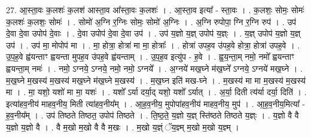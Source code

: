 \documentclass[17pt]{extarticle}
\begin{document}
27. आ॒स्ता॒वः क॒लशः॑ क॒लश॑ आस्ता॒व आ᳚स्ता॒वः क॒लशः॑ । . आ॒स्ता॒व इत्या᳚ - स्ता॒वः । . क॒लशः॒ सोमः॒ सोमः॑ क॒लशः॑ क॒लशः॒ सोमः॑ । . सोमो॑ अ॒ग्नि र॒ग्निः सोमः॒ सोमो॑ अ॒ग्निः । . अ॒ग्नि रुपोपा॒ ग्नि र॒ग्नि रुप॑ । . उप॑ दे॒वा दे॒वा उपोप॑ दे॒वाः । . दे॒वा उपोप॑ दे॒वा दे॒वा उप॑ । . उप॑ य॒ज्ञो य॒ज्ञ् उपोप॑ य॒ज्ञ्ः । . य॒ज्ञ् उपोप॑ य॒ज्ञो य॒ज्ञ् उप॑ । . उप॑ मा॒ मोपोप॑ मा । . मा॒ होत्रा॒ होत्रा॑ मा मा॒ होत्राः᳚ । . होत्रा॑ उपह॒व उ॑पह॒वे होत्रा॒ होत्रा॑ उपह॒वे । . उ॒प॒ह॒वे ह्व॑यन्ताꣳ ह्वयन्ता मुपह॒व उ॑पह॒वे ह्व॑यन्ताम् । . उ॒प॒ह॒व इत्यु॑प - ह॒वे । . ह्व॒य॒न्ता॒म् नमो॒ नमो᳚ ह्वयन्ताꣳ ह्वयन्ता॒म् नमः॑ । . नमो॒ ऽग्नये॒ ऽग्नये॒ नमो॒ नमो॒ ऽग्नये᳚ । . अ॒ग्नये॑ मख॒घ्ने म॑ख॒घ्ने᳚ ऽग्नये॒ ऽग्नये॑ मख॒घ्ने । . म॒ख॒घ्ने म॒खस्य॑ म॒खस्य॑ मख॒घ्ने म॑ख॒घ्ने म॒खस्य॑ । . म॒ख॒घ्न इति॑ मख-घ्ने । . म॒खस्य॑ मा मा म॒खस्य॑ म॒खस्य॑ मा । . मा॒ यशो॒ यशो॑ मा मा॒ यशः॑ । . यशो᳚ ऽर्या दर्या॒द् यशो॒ यशो᳚ ऽर्यात् । . अ॒र्या॒ दिती त्य॑र्या दर्या॒ दिति॑ । . इत्या॑हव॒नीय॑ माहव॒नीय॒ मिती त्या॑हव॒नीय᳚म् । . आ॒ह॒व॒नीय॒ मुपोपा॑हव॒नीय॑ माहव॒नीय॒ मुप॑ । . आ॒ह॒व॒नीय॒मित्या᳚ - ह॒व॒नीय᳚म् । . उप॑ तिष्ठते तिष्ठत॒ उपोप॑ तिष्ठते । . ति॒ष्ठ॒ते॒ य॒ज्ञो य॒ज्ञ् स्ति॑ष्ठते तिष्ठते य॒ज्ञ्ः । . य॒ज्ञो वै वै य॒ज्ञो य॒ज्ञो वै । . वै म॒खो म॒खो वै वै म॒खः । . म॒खो य॒ज्ञ्ं ॅय॒ज्ञ्म् म॒खो म॒खो य॒ज्ञ्म् । \newline
\end{document}
